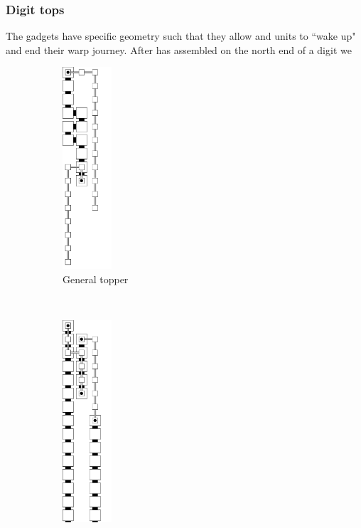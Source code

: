 \subsubsection{Digit tops}
The {\dtop} gadgets have specific geometry such that they allow {\firstwarp} and
{\secondwarp} units to ``wake up" and end their warp journey. After {\dtop} has assembled
on the north end of a digit we
\vspace{.5cm}


\begin{figure}[H]
    \centering
    \begin{subfigure}[t]{0.2\textwidth}
        \centering
        \includegraphics[width=0.2\textwidth]{digit_tops/digit_top_general_topper}
        \caption{\label{fig:topper_gen} General topper}
    \end{subfigure}%
    ~
    \begin{subfigure}[t]{0.2\textwidth}
        \centering
        \includegraphics[width=0.2\textwidth]{digit_tops/digit_top_case1_digit1_topper}

\end{subfigure}
\end{figure}
